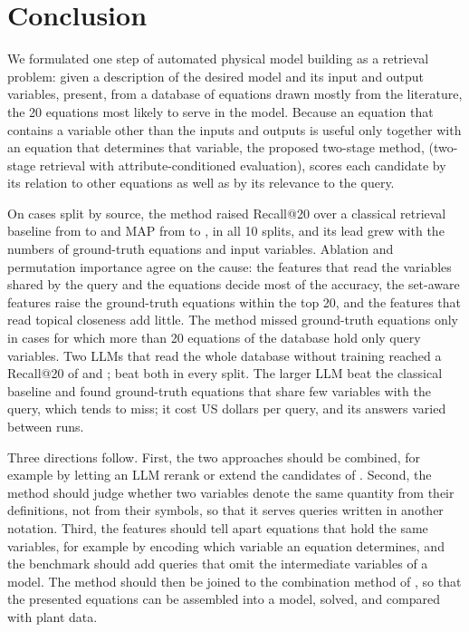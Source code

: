 \section{Conclusion}\label{sec:conclusion}

We formulated one step of automated physical model building as a retrieval problem: given a
description of the desired model and its input and output variables, present, from a database of
\NEq{} equations drawn mostly from the literature, the 20 equations most likely to serve in the
model.
Because an equation that contains a variable other than the inputs and outputs is useful only
together with an equation that determines that variable, the proposed two-stage method, \ours{} (two-stage retrieval with attribute-conditioned evaluation), scores each
candidate by its relation to other equations as well as by its relevance to the query.

On \NCases{} cases split by source, the method raised Recall@20 over a classical retrieval baseline
from \RecABase{} to \RecAProp{} and MAP from \MapABase{} to \MapAProp, in all 10 splits, and its
lead grew with the numbers of ground-truth equations and input variables. Ablation and permutation
importance agree on the cause: the features that read the variables shared by the query and the
equations decide most of the accuracy, the set-aware features raise the ground-truth equations
within the top 20, and the features that read topical closeness add little. The method missed
ground-truth equations only in cases for which more than 20 equations of the database hold only
query variables. Two LLMs that read the
whole database without training reached a Recall@20 of \RecAOpus{} and \RecAHaiku; \ours{} beat both in every split. The larger LLM beat the classical baseline and found ground-truth
equations that share few variables with the query, which \ours{} tends to miss; it cost
\CostPerCallOpus{} US dollars per query, and its answers varied between runs.

Three directions follow. First, the two approaches should be combined, for example by letting an
LLM rerank or extend the candidates of \ours{}. Second, the method should judge whether
two variables denote the same quantity from their definitions, not from their symbols, so that it
serves queries written in another notation. Third, the features should tell apart equations that
hold the same variables, for example by encoding which variable an equation determines, and the
benchmark should add queries that omit the intermediate variables of a model. The method should
then be joined to the combination method of \citet{CombineEq}, so that the presented equations can
be assembled into a model, solved, and compared with plant data.
